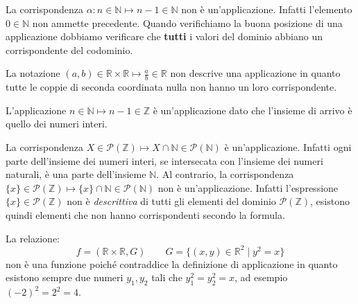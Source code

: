\begin{example}
	La corrispondenza $\alpha: n \in \mathbb{N} \mapsto n-1 \in \mathbb{N}$ non è un'applicazione. Infatti l'elemento $0 \in \mathbb{N}$ non ammette precedente. Quando verifichiamo la buona posizione di una applicazione dobbiamo verificare che \textbf{tutti} i valori del dominio abbiano un corrispondente del codominio.
\end{example}

\begin{example}
	La notazione $(a,b) \in \mathbb{R}\times \mathbb{R} \mapsto \frac{a}{b} \in \mathbb{R} $
	non descrive una applicazione in quanto tutte le coppie di seconda coordinata nulla non hanno un loro corrispondente.
\end{example}

\begin{example}
	L'applicazione $n \in \mathbb{N} \mapsto n-1 \in \mathbb{Z}$ è un'applicazione dato che l'insieme di arrivo è quello dei numeri interi.
\end{example}

\begin{example}
	La corrispondenza $X \in \mathcal{P}(\mathbb{Z}) \mapsto X \cap \mathbb{N}\in \mathcal{P}(\mathbb{N})$ è un'applicazione. Infatti ogni parte dell'insieme dei numeri interi, se intersecata con l'insieme dei numeri naturali, è una parte dell'insieme $\mathbb{N}$. Al contrario, la corrispondenza $\{x\}\in \mathcal{P}(\mathbb{Z}) \mapsto \{x\}\cap \mathbb{N} \in \mathcal{P}(\mathbb{N})$ non è un'applicazione. Infatti l'espressione $\{x\}\in \mathcal{P}(\mathbb{Z})$ non è \textit{descrittiva} di tutti gli elementi del dominio $\mathcal{P}(\mathbb{Z})$, esistono quindi elementi che non hanno corrispondenti secondo la formula.
\end{example}

\begin{example}
	La relazione:
	$$
	f=(\mathbb{R} \times \mathbb{R},G) \qquad G=\{(x,y) \in \mathbb{R}^{2} \; | \; y^{2}=x \}
	$$
	non è una funzione poiché contraddice la definizione di applicazione in quanto esistono sempre due numeri $y_{1},y_{2}$ tali che $y_{1}^{2}=y_{2}^{2}=x$, ad esempio $(-2)^{2}=2^{2}=4$.
\end{example}

